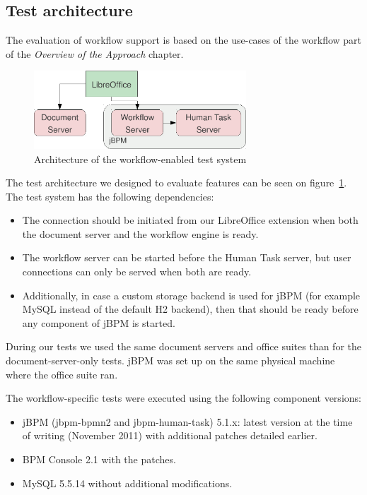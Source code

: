 \subsection*{Test architecture}

The evaluation of workflow support is based on the use-cases of the workflow
part of the \emph{Overview of the Approach} chapter.

\begin{figure}[H]
\centering
\includegraphics[width=300px,keepaspectratio]{test-arch-wf.pdf}
\caption{Architecture of the workflow-enabled test system}
\label{fig:test-arch-wf}
\end{figure}

The test architecture we designed to evaluate features can be seen on
figure~\ref{fig:test-arch-wf}. The test system has the following dependencies:

\begin{itemize}
\item The connection should be initiated from our LibreOffice extension when
both the document server and the workflow engine is ready.
\item The workflow server can be started before the Human Task server, but user
connections can only be served when both are ready.
\item Additionally, in case a custom storage backend is used for jBPM (for
example MySQL instead of the default H2 backend), then that should be ready
before any component of jBPM is started.
\end{itemize}

During our tests we used the same document servers and office suites than for
the document-server-only tests. jBPM was set up on the same physical machine
where the office suite ran.

The workflow-specific tests were executed using the following component versions:

\begin{itemize}
\item jBPM (jbpm-bpmn2 and jbpm-human-task) 5.1.x: latest version at the time
of writing (November 2011) with additional patches detailed earlier.
\item BPM Console 2.1 with the patches.
\item MySQL 5.5.14 without additional modifications.
\end{itemize}


